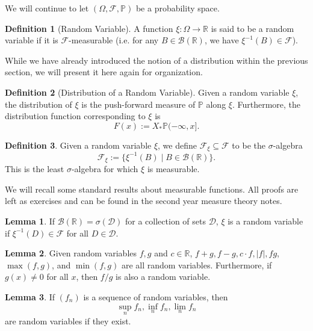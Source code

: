 \documentclass[]{article}
\theoremstyle{definition}
\theoremstyle{definition}
\newtheorem{definition}{Definition}[section]
\newtheorem{lemma}{Lemma}[section]
\begin{document}
We will continue to let \((\Omega, \mathcal{F}, \mathbb{P})\) be a probability space. 

\begin{definition}[Random Variable]
  A function \(\xi : \Omega \to \mathbb{R}\) is said to be a random variable if 
  it is \(\mathcal{F}\)-measurable (i.e. for any \(B \in \mathcal{B}(\mathbb{R})\), 
  we have \(\xi^{-1}(B) \in \mathcal{F}\)).  
\end{definition}

While we have already introduced the notion of a distribution within the previous 
section, we will present it here again for organization.

\begin{definition}[Distribution of a Random Variable]
  Given a random variable \(\xi\), the distribution of \(\xi\) is the push-forward 
  measure of \(\mathbb{P}\) along \(\xi\). Furthermore, the distribution function 
  corresponding to \(\xi\) is 
  \[F(x) := X_* \mathbb{P}(- \infty, x].\]
\end{definition}

\begin{definition}
  Given a random variable \(\xi\), we define \(\mathcal{F}_\xi \subseteq \mathcal{F}\) 
  to be the \(\sigma\)-algebra 
  \[\mathcal{F}_\xi := \{\xi^{-1}(B) \mid B \in \mathcal{B}(\mathbb{R})\}.\]
  This is the least \(\sigma\)-algebra for which \(\xi\) is measurable.
\end{definition}

We will recall some standard results about measurable functions. All proofs are 
left as exercises and can be found in the second year measure theory notes.

\begin{lemma}
  If \(\mathcal{B}(\mathbb{R}) = \sigma(\mathcal{D})\) for a collection of sets 
  \(\mathcal{D}\), \(\xi\) is a random variable if \(\xi^{-1}(D) \in \mathcal{F}\) 
  for all \(D \in \mathcal{D}\).
\end{lemma}

\begin{lemma}
  Given random variables \(f, g\) and \(c \in \mathbb{R}\), 
  \(f + g, f - g, c \cdot f, |f|, fg\), \(\max(f, g)\), and \(\min(f, g)\) are all random variables.
  Furthermore, if \(g(x) \neq 0\) for all \(x\), then \(f / g\) is also a random variable. 
\end{lemma}

\begin{lemma}
  If \((f_n)\) is a sequence of random variables, then 
  \[\sup_n f_n, \inf_n f_n, \lim_n f_n\]
  are random variables if they exist.
\end{lemma}
\end{document}

